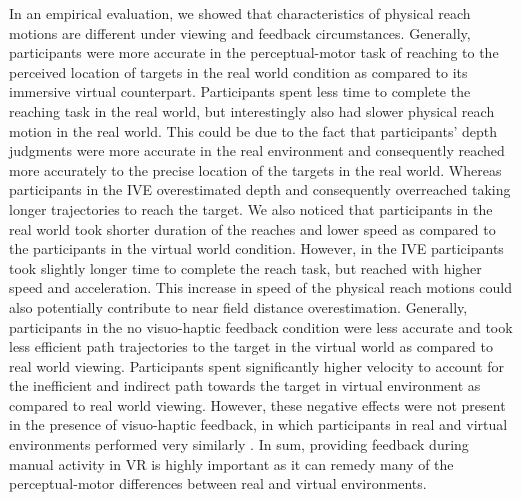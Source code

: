In an empirical evaluation, we showed that characteristics of physical reach motions are different under viewing and feedback circumstances. Generally, participants were more accurate in the perceptual-motor task of reaching to the perceived location of targets in the real world condition as compared to its immersive virtual counterpart. Participants spent less time to complete the reaching task in the real world, but interestingly also had slower physical reach motion in the real world. This could be due to the fact that participants' depth judgments were more accurate in the real environment and consequently reached more accurately to the precise location of the targets in the real world. Whereas participants in the IVE overestimated depth and consequently overreached taking longer trajectories to reach the target. We also noticed that participants in the real world took shorter duration of the reaches and lower speed as compared to the participants in the virtual world condition. However, in the IVE participants took slightly longer time to complete the reach task, but reached with higher speed and acceleration. This increase in speed of the physical reach motions could also potentially contribute to near field distance overestimation. Generally, participants in the no visuo-haptic feedback condition were less accurate and took less efficient path trajectories to the target in the virtual world as compared to real world viewing. Participants spent significantly higher velocity to account for the inefficient and indirect path towards the target in virtual environment as compared to real world viewing. However, these negative effects were not present in the presence of visuo-haptic feedback, in which participants in real and virtual environments performed very similarly \cite{MCT06}. In sum, providing feedback during manual activity in VR is highly important as it can remedy many of the perceptual-motor differences between real and virtual environments.  

